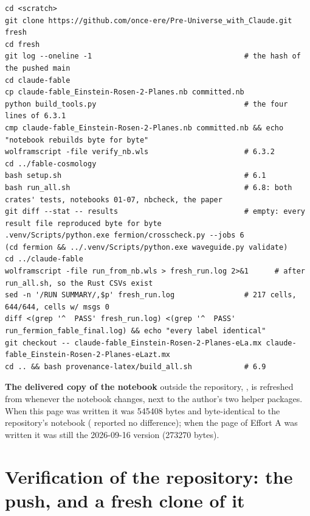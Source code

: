 \begin{Verbatim}
cd <scratch>
git clone https://github.com/once-ere/Pre-Universe_with_Claude.git fresh
cd fresh
git log --oneline -1                                   # the hash of the pushed main
cd claude-fable
cp claude-fable_Einstein-Rosen-2-Planes.nb committed.nb
python build_tools.py                                  # the four lines of 6.3.1
cmp claude-fable_Einstein-Rosen-2-Planes.nb committed.nb && echo "notebook rebuilds byte for byte"
wolframscript -file verify_nb.wls                      # 6.3.2
cd ../fable-cosmology
bash setup.sh                                          # 6.1
bash run_all.sh                                        # 6.8: both crates' tests, notebooks 01-07, nbcheck, the paper
git diff --stat -- results                             # empty: every result file reproduced byte for byte
.venv/Scripts/python.exe fermion/crosscheck.py --jobs 6
(cd fermion && ../.venv/Scripts/python.exe waveguide.py validate)
cd ../claude-fable
wolframscript -file run_from_nb.wls > fresh_run.log 2>&1      # after run_all.sh, so the Rust CSVs exist
sed -n '/RUN SUMMARY/,$p' fresh_run.log                # 217 cells, 644/644, cells w/ msgs 0
diff <(grep '^  PASS' fresh_run.log) <(grep '^  PASS' run_fermion_fable_final.log) && echo "every label identical"
git checkout -- claude-fable_Einstein-Rosen-2-Planes-eLa.mx claude-fable_Einstein-Rosen-2-Planes-eLazt.mx
cd .. && bash provenance-latex/build_all.sh            # 6.9
\end{Verbatim}

\textbf{The delivered copy of the notebook} outside the repository, , is refreshed from  whenever the notebook changes, next to the author's two helper packages. When this page was written it was 545408 bytes and byte-identical to the repository's notebook ( reported no difference); when the page of Effort A was written it was still the 2026-09-16 version (273270 bytes).

\section{Verification of the repository: the push, and a fresh clone of it}
\label{sec:7}

